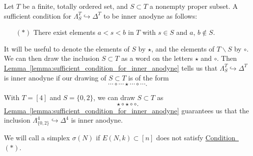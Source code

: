 \documentclass[main.tex]{subfiles}
\begin{document}
\begin{lemma}
  \label{lemma:sufficient_condition_for_inner_anodyne}
  Let $T$ be a finite, totally ordered set, and $S \subset T$ a nonempty proper subset. A sufficient condition for $\Lambda^{T}_{S} \hookrightarrow \Delta^{T}$ to be inner anodyne as follows:
  \begin{itemize}
    \item[$(*)$]\label{item:condition_for_inner_anodyne} There exist elements $a < s < b$ in $T$ with $s \in S$ and $a$, $b \notin S$.
  \end{itemize}
\end{lemma}

It will be useful to denote the elements of $S$ by $\star$, and the elements of $T \smallsetminus S$ by $\circ$. We can then draw the inclusion $S \subset T$ as a word on the letters $\star$ and $\circ$. Then \hyperref[lemma:sufficient_condition_for_inner_anodyne]{Lemma~\ref*{lemma:sufficient_condition_for_inner_anodyne}} tells us that $\Lambda^{T}_{S} \hookrightarrow \Delta^{T}$ is inner anodyne if our drawing of $S \subset T$ is of the form
\begin{equation*}
  \cdots \circ \cdots \star \cdots \circ \cdots.
\end{equation*}

\begin{example}
  With $T = [4]$ and $S = \{0, 2\}$, we can draw $S \subset T$ as
  \begin{equation*}
    \star \circ \star \circ \circ.
  \end{equation*}
  \hyperref[lemma:sufficient_condition_for_inner_anodyne]{Lemma~\ref*{lemma:sufficient_condition_for_inner_anodyne}} guarantees us that the inclusion $\Lambda^{4}_{\{0, 2\}} \hookrightarrow \Delta^{4}$ is inner anodyne.
\end{example}

\begin{definition}
  We will call a simplex $\sigma(N)$  if $E(N, k) \subset [n]$ does not satisfy \hyperref[item:condition_for_inner_anodyne]{Condition~$(*)$}.
\end{definition}
\end{document}
